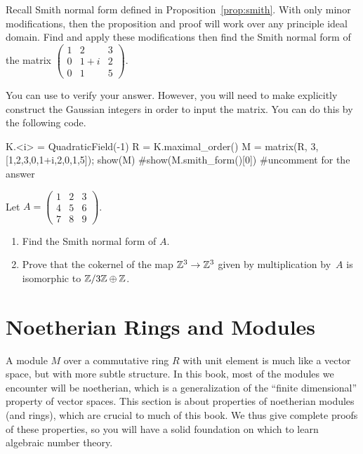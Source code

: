 \begin{exercise}
	Recall Smith normal form defined in Proposition~\ref{prop:smith}. With only minor modifications, then the proposition and proof will work over any principle ideal domain. Find and apply these modifications then find the Smith normal form of the matrix $\begin{pmatrix} 1 & 2 & 3 \\ 0 & 1+i & 2 \\ 0 & 1 & 5 \end{pmatrix}$.

	\begin{hint}
		You can use \sage{} to verify your answer. However, you will need to make explicitly construct the Gaussian integers in order to input the matrix. You can do this by the following code.
	\end{hint}
	\begin{sagecode}
	\begin{sagecell}
K.<i> = QuadraticField(-1)
R = K.maximal_order()
M = matrix(R, 3, [1,2,3,0,1+i,2,0,1,5]); show(M)
#show(M.smith_form()[0]) #uncomment for the answer
	\end{sagecell}
	\end{sagecode}
\end{exercise}

\begin{exercise}
	Let $A=\left(
	        \begin{matrix}1&2&3\\4&5&6\\7&8&9
	        \end{matrix}\right)$. 
	\begin{enumerate}
	\item Find the Smith normal form of $A$.
	\item Prove that 
	the cokernel of the map $\mathbb{Z}^3\to \mathbb{Z}^3$ given by multiplication by~$A$ 
	is isomorphic to $\mathbb{Z}/3\mathbb{Z} \oplus \mathbb{Z}$.
	\end{enumerate}
\end{exercise}

\section{Noetherian Rings and Modules}\label{sec:noetherian}

A module $M$ over a commutative ring $R$ with unit element is much
like a vector space, but with more subtle structure.  In this book,
most of the modules we encounter will be noetherian, which is a
generalization of the ``finite dimensional'' property of vector
spaces.  This section is about properties of noetherian modules (and
rings), which are crucial to much of this book.  We thus
give complete proofs of these properties, so you will have a solid
foundation on which to learn algebraic number theory.

